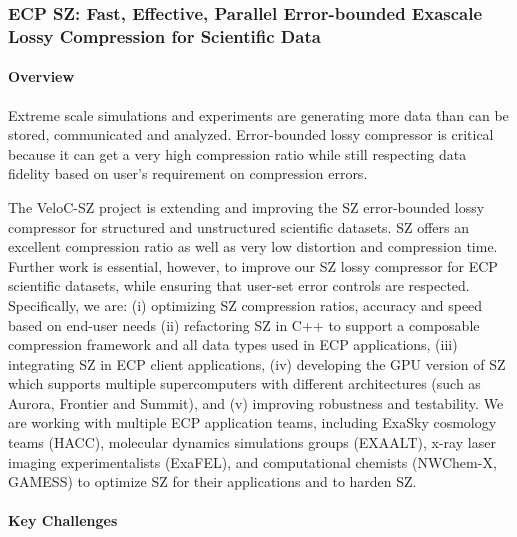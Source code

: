 \subsubsection{ ECP SZ: Fast, Effective, Parallel Error-bounded Exascale Lossy Compression for Scientific Data}

\paragraph{Overview}

Extreme scale simulations and experiments are generating more data than can be stored, communicated and analyzed. Error-bounded lossy compressor is critical because it can get a very high compression ratio while still respecting data fidelity based on user's requirement on compression errors. 

The VeloC-SZ project is extending and improving the SZ error-bounded lossy compressor for structured and unstructured scientific datasets. SZ offers an excellent compression ratio as well as very low distortion and compression time. Further work is essential, however, to improve our SZ lossy compressor for ECP scientific datasets, while ensuring that user-set error controls are respected. Specifically, we are: (i) optimizing SZ compression ratios, accuracy and speed based on end-user needs (ii) refactoring SZ in C++ to support a composable compression framework and all data types used in ECP applications, (iii) integrating SZ in ECP client applications, (iv) developing the GPU version of SZ which supports multiple supercomputers with different architectures (such as Aurora, Frontier and Summit), and (v) improving robustness and testability. %
We are working with multiple ECP application teams, including ExaSky cosmology teams (HACC), molecular dynamics simulations groups (EXAALT), x-ray laser imaging experimentalists (ExaFEL), and computational chemists (NWChem-X, GAMESS) to optimize SZ for their applications and to harden SZ.

\paragraph{Key Challenges}

